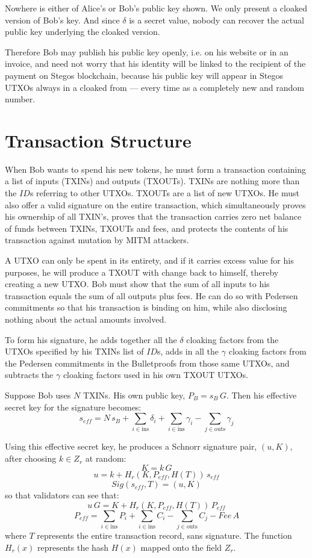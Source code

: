 \documentclass[8pt,fleqn,openany]{book}
\begin{document}
Nowhere is either of Alice’s or Bob’s public key shown. We only present a cloaked version of Bob’s key. And since $\delta$ is a secret value, nobody can recover the actual public key underlying the cloaked version. 

Therefore Bob may publish his public key openly, i.e. on his website or in an invoice, and need not worry that his identity will be linked to the recipient of the payment on Stegos blockchain, because his public key will appear in Stegos UTXOs always in a cloaked from — every time as a completely new and random number.

\section{Transaction Structure}
When Bob wants to spend his new tokens, he must form a transaction containing a list of inputs (TXINs) and outputs (TXOUTs). TXINs are nothing more than the $\mathit{ID}$s referring to other UTXOs. TXOUTs are a list of new UTXOs. He must also offer a valid signature on the entire transaction, which simultaneously proves his ownership of all TXIN’s, proves that the transaction carries zero net balance of funds between TXINs, TXOUTs and fees, and protects the contents of his transaction against mutation by MITM attackers.

A UTXO can only be spent in its entirety, and if it carries excess value for his purposes, he will produce a TXOUT with change back to himself, thereby creating a new UTXO. Bob must show that the sum of all inputs to his transaction equals the sum of all outputs plus fees. He can do so with Pedersen commitments so that his transaction is binding on him, while also disclosing nothing about the actual amounts involved.

To form his signature, he adds together all the $\delta$ cloaking factors from the UTXOs specified by his TXINs list of $\mathit{ID}$s, adds in all the $\gamma$ cloaking factors from the Pedersen commitments in the Bulletproofs from those same UTXOs, and subtracts the $\gamma$ cloaking factors used in his own TXOUT UTXOs. 

Suppose Bob uses $N$ TXINs. His own public key, $P_B = s_B \, G$. Then his effective secret key for the signature becomes:
$$s_{\mathit{eff}} = N \, s_B + \sum_{i \in \text{ins}} {\delta_i} + \sum_{i \in \text{ins}}{\gamma_i} - \sum_{j \in \text{outs}}{ \gamma_j}$$

Using this effective secret key, he produces a Schnorr signature pair, $(u, K)$, after choosing $k \in Z_r$ at random:
$$K = k \, G$$
$$u = k + H_r(K, P_{eff}, H(T)) \, s_{\mathit{eff}}$$
$$Sig(s_{eff},T) = (u, K)$$
so that validators can see that:
$$u \, G = K + H_r(K, P_{eff}, H(T)) \, P_{eff}$$
$$P_{\mathit{eff}} = \sum_{i \in \text{ins}}{P_i} + \sum_{i \in \text{ins}}{C_i} - \sum_{j \in \text{outs}}{C_j} - \mathit{Fee} \, A$$
where $T$ represents the entire transaction record, sans signature. The function $H_r(x)$ represents the hash $H(x)$ mapped onto the field $Z_r$.
\end{document}
